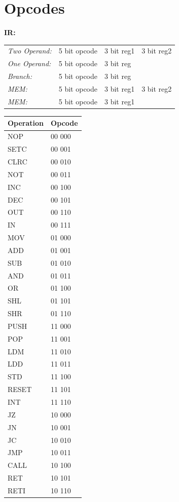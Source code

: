 \documentclass[12pt]{article}
\begin{document}
\section{Opcodes}
\textbf{IR:}

\begin{tabular}{llll}
	\emph{Two Operand: } & 5 bit opcode & 3 bit reg1 & 3 bit reg2\\
	\emph{One Operand: } & 5 bit opcode & 3 bit reg &\\
	\emph{Branch: } 	& 5 bit opcode & 3 bit reg & \\ 
	\emph{MEM: } & 5 bit opcode & 3 bit reg1 & 3 bit reg2 \\
	\emph{MEM: } & 5 bit opcode & 3 bit reg1 \\
\end{tabular}

\begin{table}[]
	\centering
	\begin{tabular}{ll}
	\hline
	Operation & Opcode \\ \hline
	NOP       & 00 000 \\
	SETC      & 00 001 \\
	CLRC      & 00 010 \\
	NOT       & 00 011 \\
	INC       & 00 100 \\
	DEC       & 00 101 \\
	OUT       & 00 110 \\
	IN        & 00 111 \\
	MOV       & 01 000 \\
	ADD       & 01 001 \\
	SUB       & 01 010 \\
	AND       & 01 011 \\
	OR        & 01 100 \\
	SHL       & 01 101 \\
	SHR       & 01 110 \\
	PUSH      & 11 000 \\
	POP       & 11 001 \\
	LDM       & 11 010 \\
	LDD       & 11 011 \\
	STD       & 11 100 \\
	RESET     & 11 101 \\
	INT       & 11 110 \\
	JZ        & 10 000 \\
	JN        & 10 001 \\
	JC        & 10 010 \\
	JMP       & 10 011 \\
	CALL      & 10 100 \\
	RET       & 10 101 \\
	RETI      & 10 110 \\ \hline
	\end{tabular}
	\end{table}
\end{document}

